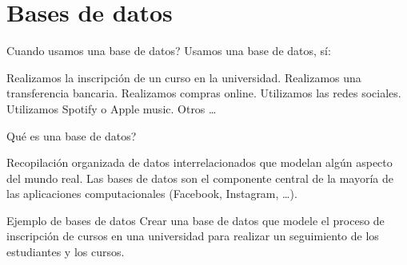 \documentclass{beamer}
\begin{document}
  \section{Bases de datos}
 
 \begin{frame}{Cuando usamos una base de datos?}
 Usamos una base de datos, sí:
 \begin{outline}
 \1 Realizamos la inscripción de un curso en la universidad.
 \1 Realizamos una transferencia bancaria.
 \1 Realizamos compras online.
 \1 Utilizamos las redes sociales.
 \1 Utilizamos Spotify o Apple music.
 \1 Otros \dots
 \end{outline}
 \end{frame} 
 
 \begin{frame}{Qué es una base de datos?}
\begin{outline}
\1 Recopilación organizada de datos interrelacionados que
modelan algún aspecto del mundo real.
\1 Las bases de datos son el componente central de la mayoría
de las aplicaciones computacionales (Facebook, Instagram, \dots).
\end{outline}
 \end{frame}
 
 \begin{frame}{Ejemplo de bases de datos}
 Crear una base de datos que modele el proceso de inscripción de cursos en una universidad
para realizar un seguimiento de los estudiantes y los cursos.

 \end{frame}
 
\end{document}
